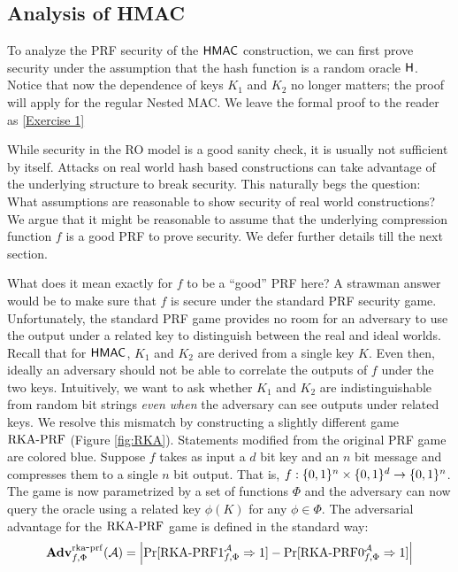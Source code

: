 \subsection{Analysis of HMAC}
To analyze the PRF security of the $\textnormal{\textsf{HMAC}}$ construction, we can first prove security under the assumption that the hash function is a random oracle $\mathsf{H}$. Notice that now the dependence of keys $K_1$ and $K_2$ no longer matters; the proof will apply for the regular Nested MAC. We leave the formal proof to the reader as \ref{Exercise 1} 

While security in the RO model is a good sanity check, it is usually not sufficient by itself. Attacks on real world hash based constructions can take advantage of the underlying structure to break security.
This naturally begs the question: What assumptions are reasonable to show security of real world constructions? We argue that it might be reasonable to assume that the underlying compression function $f$ is a good PRF to prove security. We defer further details till the next section.

What does it mean exactly for $f$ to be a ``good'' PRF here? A strawman answer would be to make sure that $f$ is secure under the standard PRF security game. Unfortunately, the standard PRF game provides no room for an adversary to use the output under a related key to distinguish between the real and ideal worlds. Recall that for $\textnormal{\textsf{HMAC}}$, $K_1$ and $K_2$ are derived from a single key $K$. Even then, ideally an adversary should not be able to correlate the outputs of $f$ under the two keys. Intuitively, we want to ask whether $K_1$ and $K_2$ are indistinguishable from random bit strings \textit{even when} the adversary can see outputs under related keys. 
We resolve this mismatch by constructing a slightly different game $\textnormal{RKA-PRF}$ (Figure \ref{fig:RKA}). Statements modified from the original PRF game are colored blue. Suppose $f$ takes as input a $d$ bit key and an $n$ bit message and compresses them to a single $n$ bit output. That is, $f: \{0,1\}^n \times \{0,1\}^d \to \{0,1\}^n$. The game is now parametrized by a set of functions $\Phi$ and the adversary can now query the oracle using a related key $\phi(K)$ for any $\phi \in \Phi$. The adversarial advantage for the $\textnormal{RKA-PRF}$ game is defined in the standard way:
\[
\mathbf{Adv}^{\mathrm{rka\mbox{-} prf}}_{f, \Phi}({\mathcal A}) = 
\left| 
    \Pr[\text{RKA-PRF1}^{\mathcal A}_{f,\Phi} \Rightarrow 1] 
    - \Pr[\text{RKA-PRF0}^{\mathcal A}_{f,\Phi} \Rightarrow 1]
\right|
\]



